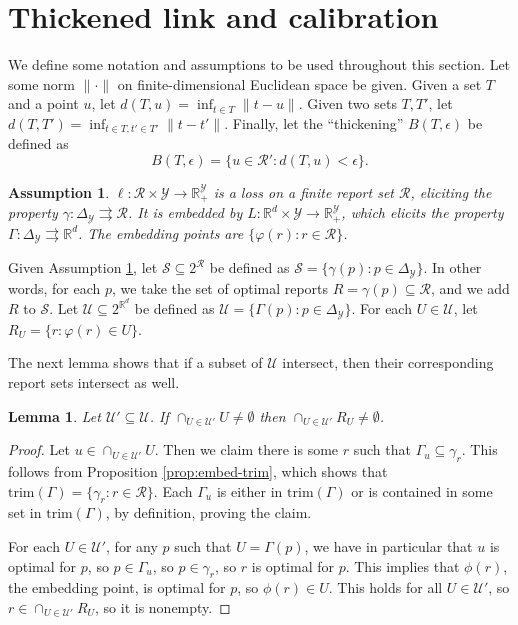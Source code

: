 \documentclass[12pt]{article}
\newcommand{\reals}{\mathbb{R}}
\newcommand{\simplex}{\Delta_\Y}
\newcommand{\R}{\mathcal{R}}
\newcommand{\U}{\mathcal{U}}
\newcommand{\Y}{\mathcal{Y}}
\newcommand{\toto}{\rightrightarrows}
\newcommand{\trim}{\mathrm{trim}}
\newtheorem{lemma}{Lemma}
\newtheorem{assumption}{Assumption}
\begin{document}
\section{Thickened link and calibration} \label{app:calibration}

We define some notation and assumptions to be used throughout this section.
Let some norm $\|\cdot\|$ on finite-dimensional Euclidean space be given.
Given a set $T$ and a point $u$, let $d(T,u) = \inf_{t \in T} \|t-u\|$.
Given two sets $T,T'$, let $d(T,T') = \inf_{t\in T, t' \in T'} \|t-t'\|$.
Finally, let the ``thickening'' $B(T,\epsilon)$ be defined as
  \[ B(T,\epsilon) = \{u \in \R' : d(T,u) < \epsilon \} . \]

\begin{assumption} \label{assume:cal}
  $\ell: \R \times \Y \to \reals^{\Y}_+$ is a loss on a finite report set $\R$, eliciting the property $\gamma: \simplex \toto \R$.
  It is embedded by $L: \reals^d \times \Y \to \reals^{\Y}_+$, which elicits the property $\Gamma: \simplex \toto \reals^d$.
  The embedding points are $\{\varphi(r) : r \in \R\}$.
\end{assumption}

Given Assumption \ref{assume:cal}, let $\mathcal{S} \subseteq 2^{\R}$ be defined as $\mathcal{S} = \{\gamma(p) : p \in \Delta_{\Y}\}$.
In other words, for each $p$, we take the set of optimal reports $R = \gamma(p) \subseteq \R$, and we add $R$ to $\mathcal{S}$.
Let $\U \subseteq 2^{\reals^d}$ be defined as $\U = \{\Gamma(p) : p \in \Delta_{\Y}\}$.
For each $U \in \U$, let $R_U = \{r: \varphi(r) \in U\}$.

The next lemma shows that if a subset of $\U$ intersect, then their corresponding report sets intersect as well.
\begin{lemma} \label{lemma:calibrated-pos}
  Let $\U' \subseteq \U$.
  If $\cap_{U\in\U'} U \neq \emptyset$ then $\cap_{U\in\U'} R_U \neq \emptyset$.
\end{lemma}
\begin{proof}
  Let $u \in \cap_{U\in\U'} U$.
  Then we claim there is some $r$ such that $\Gamma_u \subseteq \gamma_r$.
  This follows from Proposition \ref{prop:embed-trim}, which shows that $\trim(\Gamma) = \{ \gamma_r : r \in \R\}$.
  Each $\Gamma_u$ is either in $\trim(\Gamma)$ or is contained in some set in $\trim(\Gamma)$, by definition, proving the claim.

  For each $U \in \U'$, for any $p$ such that $U = \Gamma(p)$, we have in particular that $u$ is optimal for $p$, so $p \in \Gamma_u$, so $p \in \gamma_r$, so $r$ is optimal for $p$.
  This implies that $\phi(r)$, the embedding point, is optimal for $p$, so $\phi(r) \in U$.
  This holds for all $U \in \U'$, so $r \in \cap_{U\in\U'} R_U$, so it is nonempty.
\end{proof}
\end{document}
